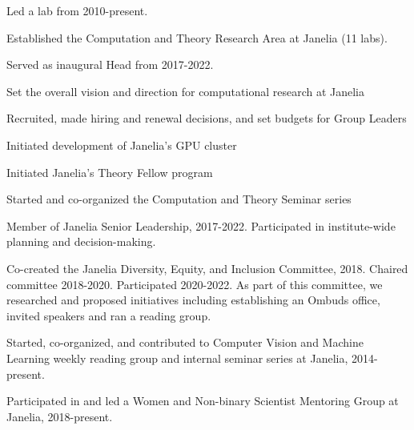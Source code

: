 \documentclass[11pt, letterpaper]{awesome-cv}
\begin{document}
\vspace{\acvSectionContentTopSkip}
\vspace{2mm}
\begin{cvitems}
\item Led a lab from 2010-present.
\item Established the Computation and Theory Research Area at Janelia (11 labs).
\vspace{4mm}
\begin{cvitems}
\item Served as inaugural Head from 2017-2022. 
\item Set the overall vision and direction for computational research at Janelia
\item Recruited, made hiring and renewal decisions, and set budgets for Group Leaders
\item Initiated development of Janelia's GPU cluster
\item Initiated Janelia's Theory Fellow program
\item Started and co-organized the Computation and Theory Seminar series 
\end{cvitems}
\vspace{4mm}
\item Member of Janelia Senior Leadership, 2017-2022. Participated in institute-wide planning and decision-making.
\item Co-created the Janelia Diversity, Equity, and Inclusion Committee, 2018. Chaired committee 2018-2020. Participated 2020-2022. As part of this committee, we researched and proposed initiatives including establishing an Ombuds office, invited speakers and ran a reading group.
\item Started, co-organized, and contributed to Computer Vision and Machine Learning weekly reading group and internal seminar series at Janelia, 2014-present.
\item Participated in and led a Women and Non-binary Scientist Mentoring Group at Janelia, 2018-present.
\end{cvitems}
\vspace{\acvSectionContentTopSkip}

\vspace{\acvSectionContentTopSkip}
\vspace{2mm}
\end{document}
